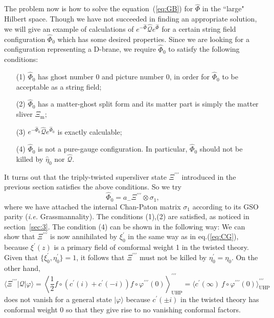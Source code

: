 \documentclass[a4paper,12pt]{article}
\newcommand{\cQ}{\mathcal{Q}}
\newcommand{\tp}{\prime\prime\prime}
\begin{document}
The problem now is how to solve the equation~(\ref{eq:GB}) for $\widehat{\Phi}$ in the ``large" Hilbert space. 
Though we have not succeeded in finding an appropriate solution, we will give an example of calculations 
of $e^{-\widehat{\Phi}}\widehat{\cQ}e^{\widehat{\Phi}}$ for a certain string field configuration 
$\widehat{\Phi}_0$ which has some desired properties. Since we are looking for a configuration 
representing a D-brane, we require $\widehat{\Phi}_0$ to satisfy the following conditions: 
\begin{itemize}
\item[(1)] $\widehat{\Phi}_0$ has ghost number 0 and picture number 0, in order for $\widehat{\Phi}_0$ 
to be acceptable as a string field;
\item[(2)] $\widehat{\Phi}_0$ has a matter-ghost split form and its matter part is simply the 
matter sliver $\Xi_{\mathrm{m}}$;
\item[(3)] $e^{-\widehat{\Phi}_0}\widehat{\cQ}e^{\widehat{\Phi}_0}$ is exactly calculable;
\item[(4)] $\widehat{\Phi}_0$ is not a pure-gauge configuration. In particular, $\widehat{\Phi}_0$ 
should not be killed by $\widehat{\eta}_0$ nor $\widehat{\cQ}$.
\end{itemize}
It turns out that the triply-twisted supersliver state $\Xi^{\tp}$ introduced in the previous section 
satisfies the above conditions. So we try  
\begin{equation}
\widehat{\Phi}_0=a_-\Xi^{\tp}\otimes\sigma_1, \label{eq:GC}
\end{equation}
where we have attached the internal Chan-Paton matrix $\sigma_1$ according to its GSO parity (\textit{i.e.} 
Grassmannality). The conditions (1),(2) are satisfied, as noticed in section~\ref{sec:3}. 
The condition (4) can be shown in the following way: 
We can show that $\Xi^{\tp}$ is now annihilated 
by $\xi_0^{\prime}$ in the same way as in eq.(\ref{eq:CG}), because $\xi^{\prime}(z)$ is a primary field 
of comformal weight 1 in the twisted theory. Given that $\{\xi^{\prime}_0,\eta^{\prime}_0\}=1$, it follows that 
$\Xi^{\tp}$ must not be killed by $\eta^{\prime}_0=\eta_0$. On the other hand, 
\[ \langle\Xi^{\tp}|\cQ|\varphi\rangle=\left\langle\frac{1}{2}f\circ(c^{\prime}(i)+c^{\prime}(-i))
f\circ\varphi^{\tp}(0)\right\rangle^{\tp}_{\mathrm{UHP}}=\langle c^{\prime}(\infty)\ f\circ\varphi^{\tp}(0)
\rangle^{\tp}_{\mathrm{UHP}} \]
does not vanish for a general state $|\varphi\rangle$ 
because $c^{\prime}(\pm i)$ in the twisted theory has 
conformal weight 0 so that they give rise to no vanishing conformal factors. 
\smallskip
\end{document}
